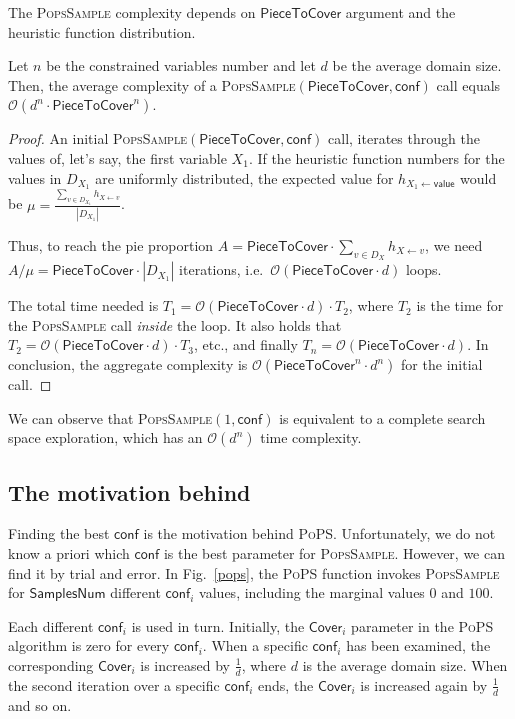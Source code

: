 \documentclass{ws-ijait}
\begin{document}
The \textsc{PopsSample} complexity depends on $\mathsf{PieceToCover}$ argument and the heuristic function distribution.
\begin{lemma}
Let $n$ be the constrained variables number and let $d$ be the average domain size. Then, the average complexity of a \textsc{PopsSample}$(\mathsf{PieceToCover},\mathsf{conf})$ call equals $\mathcal{O}(d^n \cdot \mathsf{PieceToCover}^n)$.
\end{lemma}
\begin{proof}
An initial \textsc{PopsSample}$(\mathsf{PieceToCover},\mathsf{conf})$ call, iterates through the values of, let's say, the first variable $X_1$. If the heuristic function numbers for the values in $D_{X_1}$ are uniformly distributed, the expected value for $h_{X_1 \gets \mathsf{value}}$ would be $\mu = \frac{\sum_{v \in D_{X_1}} h_{X \gets v}}{|D_{X_1}|}$.

Thus, to reach the pie proportion $A = \mathsf{PieceToCover} \cdot \sum_{v \in D_X} h_{X \gets v}$, we need $A / \mu = \mathsf{PieceToCover} \cdot |D_{X_1}|$ iterations, i.e.\ $\mathcal{O}(\mathsf{PieceToCover} \cdot d)$ loops.

The total time needed is $T_1 = \mathcal{O}(\mathsf{PieceToCover} \cdot d) \cdot T_2$, where $T_2$ is the time for the \textsc{PopsSample} call \emph{inside} the loop. It also holds that $T_2 = \mathcal{O}(\mathsf{PieceToCover} \cdot d) \cdot T_3$, etc., and finally $T_n = \mathcal{O}(\mathsf{PieceToCover} \cdot d)$. In conclusion, the aggregate complexity is $\mathcal{O}(\mathsf{PieceToCover}^n \cdot d^n)$ for the initial call.
\end{proof}
We can observe that \textsc{PopsSample}$(1,\mathsf{conf})$ is equivalent to a complete search space exploration, which has an $\mathcal{O}(d^n)$ time complexity.

\subsection{The motivation behind \PoPS\label{sampling}}

Finding the best $\mathsf{conf}$ is the motivation behind \textsc{PoPS}. Unfortunately, we do not know a priori which $\mathsf{conf}$ is the best parameter for \textsc{PopsSample}. However, we can find it by trial and error. In Fig.~\ref{pops}, the \textsc{PoPS} function invokes \textsc{PopsSample} for $\mathsf{SamplesNum}$ different $\mathsf{conf}_i$ values, including the marginal values $0$ and $100$.

Each different $\mathsf{conf}_i$ is used in turn. Initially, the $\mathsf{Cover}_i$ parameter in the \textsc{PoPS} algorithm is zero for every $\mathsf{conf}_i$. When a specific $\mathsf{conf}_i$ has been examined, the corresponding $\mathsf{Cover}_i$ is increased by $\frac{1}{d}$, where $d$ is the average domain size. When the second iteration over a specific $\mathsf{conf}_i$ ends, the $\mathsf{Cover}_i$ is increased again by $\frac{1}{d}$ and so on.
\end{document}
